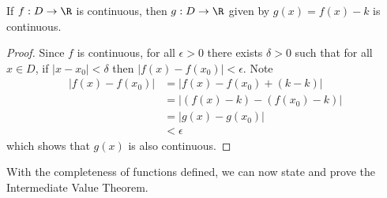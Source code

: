 \begin{proposition}\label{prop-continuous-function-translated-is-continuous}
    If $f: D \to \R$ is continuous, then $g: D \to \R$ given by $g(x) = f(x) - k$ is continuous.
\end{proposition}
\begin{proof}
    Since $f$ is continuous, for all $\epsilon > 0$ there exists $\delta > 0$ such that for all $x \in D$, if $|x - x_0| < \delta$ then $|f(x) - f(x_0)| < \epsilon$. Note
    \begin{align*}
        |f(x) - f(x_0)| &= |f(x) - f(x_0) + (k - k)|\\
        &= |(f(x) - k) - (f(x_0) - k)|\\
        &= |g(x) - g(x_0)|\\
        &< \epsilon
    \end{align*}
    which shows that $g(x)$ is also continuous.
\end{proof}

With the completeness of functions defined, we can now state and prove the Intermediate Value Theorem.

